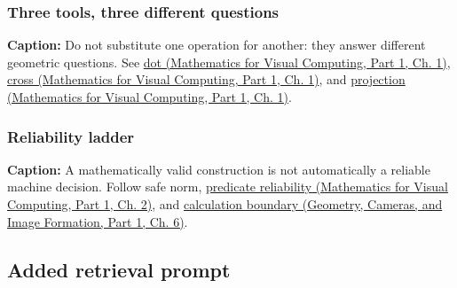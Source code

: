 \subsubsection{Three tools, three different questions}\label{appendix-38d9c8aca357-three-tools-three-different-questions}

\hypertarget{appendix-38d9c8aca357-three-tools-three-different-questions}{}


\textbf{Caption:} Do not substitute one operation for another: they answer different geometric questions. See \href{../02-Mathematics-for-Visual-Computing-P01/main.pdf\#nameddest=01-foundations-i-ch017-the-dot-product-turns-two-movements-into-a-measurement}{dot (Mathematics for Visual Computing, Part 1, Ch. 1)}, \href{../02-Mathematics-for-Visual-Computing-P01/main.pdf\#nameddest=01-foundations-i-ch017-oriented-area-tells-us-which-side-of-the-panel-is-front}{cross (Mathematics for Visual Computing, Part 1, Ch. 1)}, and \href{../02-Mathematics-for-Visual-Computing-P01/main.pdf\#nameddest=01-foundations-i-ch017-projection-separates-useful-movement-from-sideways-movement}{projection (Mathematics for Visual Computing, Part 1, Ch. 1)}.

\subsubsection{Reliability ladder}\label{appendix-38d9c8aca357-reliability-ladder}

\hypertarget{appendix-38d9c8aca357-reliability-ladder}{}


\textbf{Caption:} A mathematically valid construction is not automatically a reliable machine decision. Follow {safe norm}, \href{../02-Mathematics-for-Visual-Computing-P01/main.pdf\#nameddest=01-foundations-i-ch018-a-predicate-needs-a-trustworthy-sign}{predicate reliability (Mathematics for Visual Computing, Part 1, Ch. 2)}, and \href{../03-Geometry-Cameras-and-Image-Formation-P01/main.pdf\#nameddest=02-foundations-ii-ch037-reliability-begins-at-the-boundary-of-the-calculation}{calculation boundary (Geometry, Cameras, and Image Formation, Part 1, Ch. 6)}.

\subsection{Added retrieval prompt}\label{appendix-38d9c8aca357-added-retrieval-prompt}

